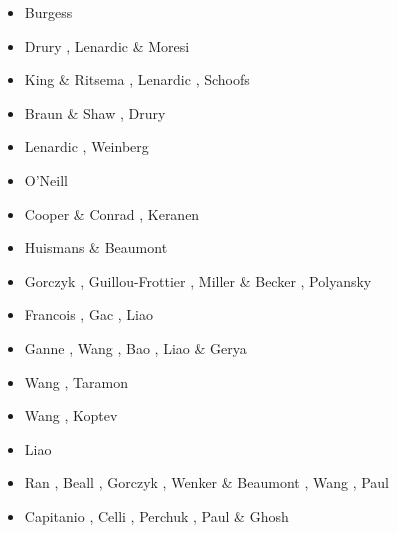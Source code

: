 \begin{scriptsize}
\begin{itemize}
\item[\nineteenninetyseven] Burgess \etal \cite{bugm97}
\item[\nineteenninetynine] Drury \etal \cite{drdv99}, Lenardic \& Moresi \cite{lemo99}
\item[\twothousand] King \& Ritsema \cite{kiri00}, Lenardic \etal \cite{lemm00},
                    Schoofs \etal \cite{scth00}
\item[\twothousandone] Braun \& Shaw \cite{brsh01}, Drury \etal \cite{drvc01}
\item[\twothousandthree] Lenardic \etal \cite{lemm03}, Weinberg \etal \cite{wemv03}
\item[\twothousandeight] O'Neill \cite{onlg08}
\item[\twothousandnine] Cooper \& Conrad \cite{coco09}, Keranen \etal \cite{kekj09}
\item[\twothousandeleven] Huismans \& Beaumont \cite{hube11}
\item[\twothousandtwelve] Gorczyk \etal \cite{gohg12}, Guillou-Frottier \etal \cite{gubc12},
                          Miller \& Becker \cite{mibe12}, Polyansky \etal \cite{pokb12}
\item[\twothousandthirteen] Francois \etal \cite{frbm13}, Gac \etal \cite{gahs13},
                            Liao \etal \cite{ligw13}
\item[\twothousandfourteen] Ganne \etal \cite{gagb14}, Wang \etal \cite{wavp14},
                            Bao \etal \cite{baeg14}, Liao \& Gerya \cite{lige14}
\item[\twothousandfifteen] Wang \etal \cite{wahz15,wazh15}, Taramon \etal \cite{tarn15}
\item[\twothousandsixteen] Wang \etal \cite{wahz16}, Koptev \etal \cite{kobc16}
\item[\twothousandseventeen] Liao \etal \cite{liwg17}
\item[\twothousandeighteen] Ran \etal \cite{rabw18}, Beall \etal \cite{bemc18},
                            Gorczyk \etal \cite{gomb18}, Wenker \& Beaumont \cite{webe18b},
                            Wang \etal \cite{wavp18}, Paul \etal \cite{pagc19}
\item[\twothousandtwenty] Capitanio \etal \cite{canc20}, Celli \etal \cite{cels20},
                          Perchuk \etal \cite{pegz20}, Paul \& Ghosh \cite{pagh20}
\end{itemize}
\end{scriptsize}




